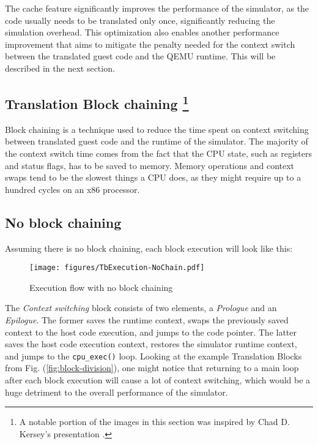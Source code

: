 The cache feature significantly improves the performance of the simulator, as the code usually needs to be translated only
once, significantly reducing the simulation overhead. This optimization also enables another performance improvement
that aims to mitigate the penalty needed for the context switch between the translated guest code and the
QEMU runtime. This will be described in the next section.

\pagebreak
\subsection[Translation Block chaining]{Translation Block chaining
\footnote{A notable portion of the images in this section was inspired by Chad D. Kersey's presentation
\cite{QemuInternalsPresentation}.}}

Block chaining is a technique used to reduce the time spent on context switching between translated guest code and the
runtime of the simulator. The majority of the context switch time comes from the fact that the CPU state, such as
registers and status flags, has to be saved to memory. Memory operations and context swaps tend to be
the slowest things a CPU does, as they might require up to a hundred cycles on an x86 processor.

\subsection*{No block chaining}

Assuming there is no block chaining, each block execution will look like this:
\begin{figure}[h]
	\centering
	\texttt{[image: figures/TbExecution-NoChain.pdf]}
	\caption{Execution flow with no block chaining}
\end{figure}

\noindent
The \textit{Context switching} block consists of two elements, a \textit{Prologue} and an \textit{Epilogue}. The former
saves the runtime context, swaps the previously saved context to the host code execution, and jumps to the code pointer.
The latter saves the host code execution context, restores the simulator runtime context, and jumps to the
\texttt{cpu\_exec()} loop.
Looking at the example Translation Blocks from Fig. (\ref{fig:block-division}), one might notice that returning to a
main loop after each block execution will cause a lot of context switching, which would be a huge detriment to the
overall performance of the simulator.

